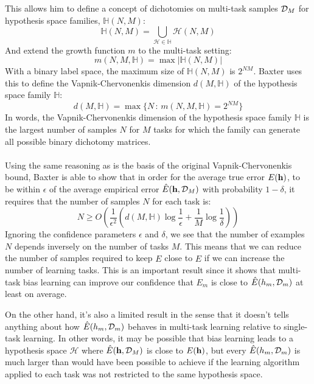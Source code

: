 This allows him to define a concept of dichotomies on multi-task samples $\mathcal{D}_M$ for hypothesis space families, $\mathbb{H}(N, M)$:
$$
\mathbb{H}(N, M) = \bigcup\limits_{\mathcal{H} \in \mathbb{H}} \mathcal{H}(N, M)
$$
And extend the growth function $m$ to the multi-task setting:
$$
m(N, M, \mathbb{H}) = \max|\mathbb{H}(N, M)|
$$
With a binary label space, the maximum size of $\mathbb{H}(N, M)$ is $2^{NM}$. Baxter uses this to define the Vapnik-Chervonenkis dimension $d(M, \mathbb{H})$ of the hypothesis space family $\mathbb{H}$:
$$
d(M, \mathbb{H}) = \max\{N\, : \, m(N, M, \mathbb{H}) = 2^{NM}\}
$$
In words, the Vapnik-Chervonenkis dimension of the hypothesis space family $\mathbb{H}$ is the largest number of samples $N$ for $M$ tasks for which the family can generate all possible binary dichotomy matrices.
\\\\
Using the same reasoning as is the basis of the original Vapnik-Chervonenkis bound, Baxter is able to show that in order for the average true error $E(\mathbf{h})$, to be within $\epsilon$ of the average empirical error $\hat{E}(\mathbf{h}, \mathcal{D}_M)$ with probability $1 - \delta$, it requires that the number of samples $N$ for each task is:
$$
N \geq O\left(\frac{1}{\epsilon^2}\left(d(M, \mathbb{H}) \log \frac{1}{\epsilon} + \frac{1}{M} \log \frac{1}{\delta}\right)\right)
$$
Ignoring the confidence parameters $\epsilon$ and $\delta$, we see that the number of examples $N$ depends inversely on the number of tasks $M$. This means that we can reduce the number of samples required to keep $E$ close to $\hat{E}$ if we can increase the number of learning tasks. This is an important result since it shows that multi-task bias learning can improve our confidence that $E_m$ is close to $\hat{E}(h_m, \mathcal{D}_m)$ at least on average. 

On the other hand, it's also a limited result in the sense that it doesn't tells anything about how $\hat{E}(h_m, \mathcal{D}_m)$ behaves in multi-task learning relative to single-task learning. In other words, it may be possible that bias learning leads to a hypothesis space $\mathcal{H}$ where $\hat{E}(\mathbf{h}, \mathcal{D}_M)$ is close to $E(\mathbf{h})$, but every $\hat{E}(h_m, \mathcal{D}_m)$ is much larger than would have been possible to achieve if the learning algorithm applied to each task was not restricted to the same hypothesis space.